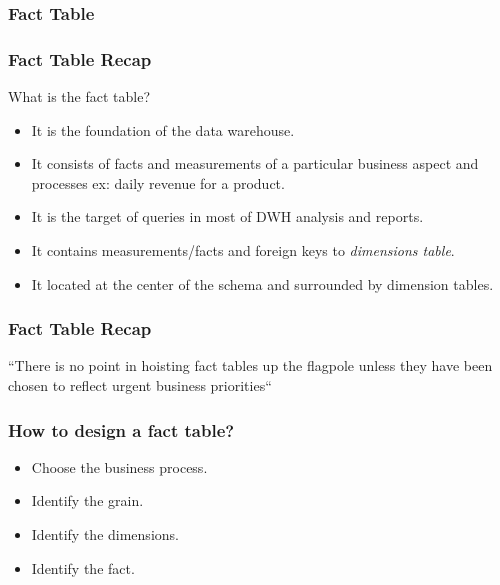 \VideoClassification[column=1, colour=red]



\subsubsection{Fact Table}

\begin{frame}
	\frametitle{Fact Table Recap}
	What is the fact table?
    	\begin{itemize}
    		\item It is the foundation of the data warehouse.
            \item It consists of facts and measurements of a particular business aspect and processes ex: daily revenue for a product.
    		\item It is the target of queries in most of DWH analysis and reports.
            \item It contains measurements/facts and foreign keys to \textit{dimensions table}. 
            \item It located at the center of the schema and surrounded by dimension tables.
    	\end{itemize}
\end{frame}
\begin{frame}
	\frametitle{Fact Table Recap}

          \begin{fquote}
        ``There is no point in hoisting fact tables up the flagpole unless they have been chosen to reflect urgent business priorities``
          \end{fquote}

\end{frame}
\begin{frame}
	\frametitle{How to design a fact table?}
    
    	\begin{itemize}
    		\item Choose the business process.
            \item Identify the grain.
            \item Identify the dimensions.
            \item Identify the fact.
    	\end{itemize}
\end{frame}

